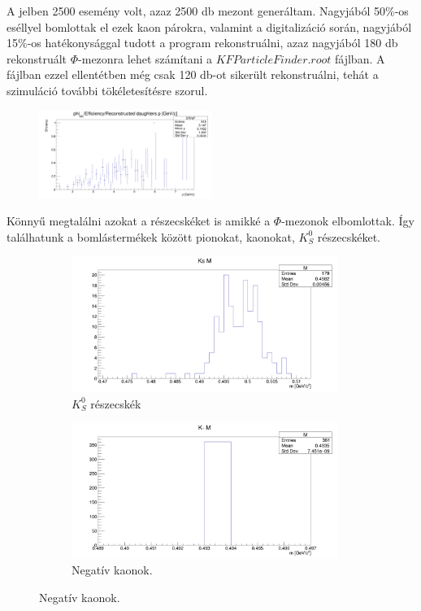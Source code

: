 \documentclass[a4paper,12pt]{article}
\begin{document}
\par A jelben 2500 esemény volt, azaz 2500 db mezont generáltam. Nagyjából 50$\%$-os eséllyel bomlottak el ezek kaon párokra, 
valamint a digitalizáció során, nagyjából 15$\%$-os hatékonysággal tudott a program rekonstruálni, azaz nagyjából 180 db rekonstruált
$\Phi$-mezonra lehet számítani a $KFParticleFinder.root$ fájlban. A fájlban ezzel ellentétben még csak 120 db-ot sikerült rekonstruálni, tehát
a szimuláció további tökéletesítésre szorul.
\begin{figure}[H]
	\centering
	\includegraphics[width=0.5\textwidth]{reconstructed_eff_phi2500.png}
\end{figure}
\par Könnyű megtalálni azokat a részecskéket is amikké a $\Phi$-mezonok elbomlottak. Így találhatunk a bomlástermékek között
pionokat, kaonokat, $K^{0}_{S}$ részecskéket. 
\begin{figure}[H]
	\centering
	\begin{subfigure}{0.49\textwidth}
		\centering
		\includegraphics[width=0.95\textwidth]{kshort_phi2500.png}
		\caption{ $K^{0}_{S}$ részecskék }
	\end{subfigure}
	\begin{subfigure}{0.49\textwidth}
		\centering
		\includegraphics[width=0.95\textwidth]{k-_phi2500.png}
		\caption{ Negatív kaonok. }
	\end{subfigure}
\end{figure}
\end{document}
